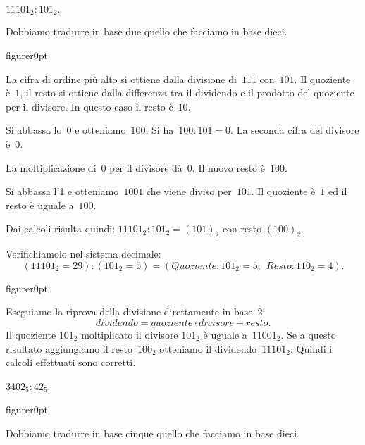 \begin{exrig}

\begin{esempio}
$11101_{2}:101_{2}.$
\end{esempio}
Dobbiamo tradurre in base due quello che facciamo in base dieci.

\begin{wrapfloat}{figure}{r}{0pt}

\end{wrapfloat}

La cifra di ordine più alto si ottiene dalla divisione di~$111$ con~$101$.
Il quoziente è~$1$, il resto si ottiene dalla differenza tra
il dividendo e il prodotto del quoziente per il divisore. In questo
caso il resto è~$10$.

Si abbassa lo~$0$ e otteniamo~$100$. Si ha~$100:101=0$. La seconda
cifra del divisore è~$0$.

La moltiplicazione di~$0$ per il divisore dà~$0$. Il nuovo resto è~$100$.

Si abbassa l'1 e otteniamo~$1001$ che viene diviso per~$101$. Il quoziente è~$1$
ed il resto è uguale a~$100$.

Dai calcoli risulta quindi: $11101_{2}:101_{2} = (101)_2$ con resto $(100)_2$.

Verifichiamolo nel sistema decimale:
\[(11101_{2}=29):(101_{2}=5)=(\mathit{Quoziente}:101_{2}=5;\:\:\mathit{Resto}:110_{2}=4).\]

\begin{wrapfloat}{figure}{r}{0pt}

\end{wrapfloat}
Eseguiamo la riprova della divisione direttamente in base~2:
\[\mathit{dividendo}=\mathit{quoziente}\cdot\mathit{divisore}+\mathit{resto}.\]
Il quoziente $101_2$ moltiplicato il divisore $101_2$ è uguale a~$11001_2$.
Se a questo risultato aggiungiamo il resto~$100_2$ otteniamo il dividendo~$11101_2$. Quindi i calcoli effettuati sono corretti.

\pagebreak
\begin{esempio}
$3402_{5}:42_{5}$.
\end{esempio}

\begin{wrapfloat}{figure}{r}{0pt}
 
\end{wrapfloat}
Dobbiamo tradurre in base cinque quello che facciamo in base dieci.


\end{exrig}
